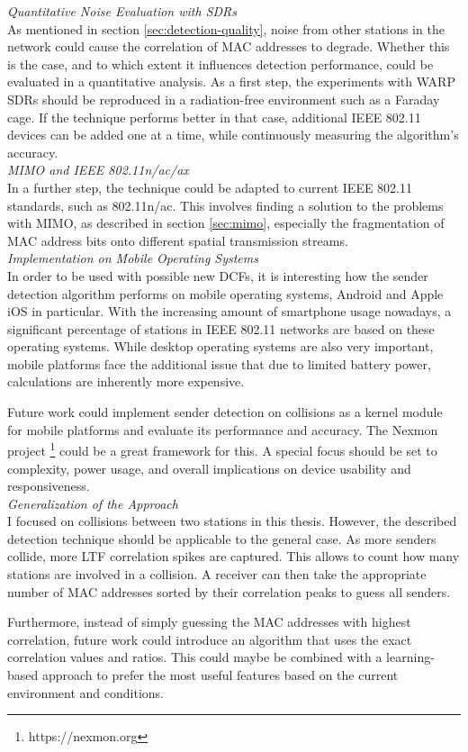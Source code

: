 \clearpage
\textit{Quantitative Noise Evaluation with SDRs}\\

As mentioned in section \ref{sec:detection-quality}, noise from other stations in the network could cause the correlation of \gls{MAC} addresses to degrade. Whether this is the case, and to which extent it influences detection performance, could be evaluated in a quantitative analysis. As a first step, the experiments with \gls{WARP} \glspl{SDR} should be reproduced in a radiation-free environment such as a Faraday cage. If the technique performs better in that case, additional IEEE 802.11 devices can be added one at a time, while continuously measuring the algorithm's accuracy.\\

\textit{MIMO and IEEE 802.11n/ac/ax}\\

In a further step, the technique could be adapted to current IEEE 802.11 standards, such as 802.11n/ac. This involves finding a solution to the problems with \gls{MIMO}, as described in section \ref{sec:mimo}, especially the fragmentation of \gls{MAC} address bits onto different spatial transmission streams.\\

\textit{Implementation on Mobile Operating Systems}\\

In order to be used with possible new \glspl{DCF}, it is interesting how the sender detection algorithm performs on mobile operating systems, Android and Apple iOS in particular. With the increasing amount of smartphone usage nowadays, a significant percentage of stations in IEEE 802.11 networks are based on these operating systems. While desktop operating systems are also very important, mobile platforms face the additional issue that due to limited battery power, calculations are inherently more expensive.

Future work could implement sender detection on collisions as a kernel module for mobile platforms and evaluate its performance and accuracy. The Nexmon project \footnote{https://nexmon.org} could be a great framework for this. A special focus should be set to complexity, power usage, and overall implications on device usability and responsiveness.\\

\textit{Generalization of the Approach}\\

I focused on collisions between two stations in this thesis. However, the described detection technique should be applicable to the general case. As more senders collide, more \gls{LTF} correlation spikes are captured. This allows to count how many stations are involved in a collision. A receiver can then take the appropriate number of \gls{MAC} addresses sorted by their correlation peaks to guess all senders.

Furthermore, instead of simply guessing the \gls{MAC} addresses with highest correlation, future work could introduce an algorithm that uses the exact correlation values and ratios. This could maybe be combined with a learning-based approach to prefer the most useful features based on the current environment and conditions.
